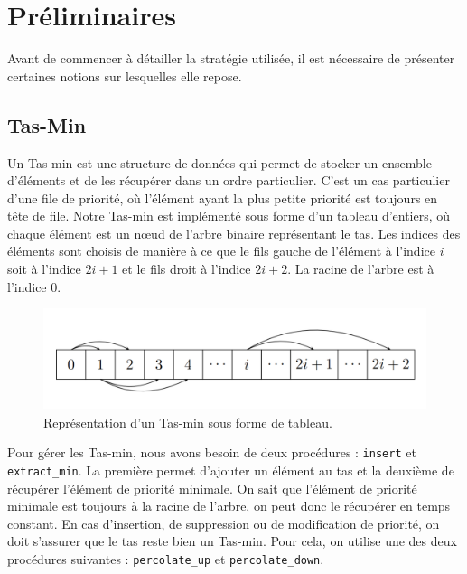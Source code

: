\chapter{Préliminaires}
\label{cp:preliminaires}

Avant de commencer à détailler la stratégie utilisée, il est nécessaire de présenter certaines notions sur lesquelles elle repose.

\section{Tas-Min}
\label{sec:tas-min}

Un Tas-min \citep{tasmin} est une structure de données qui permet de stocker un ensemble d'éléments et de les récupérer dans un ordre particulier. 
C'est un cas particulier d'une file de priorité, où l'élément ayant la plus petite priorité est toujours en tête de file.
\newline\newline
Notre Tas-min est implémenté sous forme d'un tableau d'entiers, où chaque élément est un nœud de l'arbre binaire représentant le tas.
Les indices des éléments sont choisis de manière à ce que le fils gauche de l'élément à l'indice $i$ soit à l'indice $2i + 1$ et le fils droit à l'indice $2i + 2$.
La racine de l'arbre est à l'indice 0.

\begin{figure}[!htpb]
    \centering
    \includegraphics[width=0.9\linewidth]{Figures/array.png}
    \caption[Représentation d'un Tas-min sous forme de tableau.]{Représentation d'un Tas-min sous forme de tableau.}
    \label{fig:array}
\end{figure}

Pour gérer les Tas-min, nous avons besoin de deux procédures : \texttt{insert} et \texttt{extract\_min}.
La première permet d'ajouter un élément au tas et la deuxième de récupérer l'élément de priorité minimale.
\newline
On sait que l'élément de priorité minimale est toujours à la racine de l'arbre, on peut donc le récupérer en temps constant.
En cas d'insertion, de suppression ou de modification de priorité, on doit s'assurer que le tas reste bien un Tas-min.
Pour cela, on utilise une des deux procédures suivantes : \texttt{percolate\_up} et \texttt{percolate\_down}.

